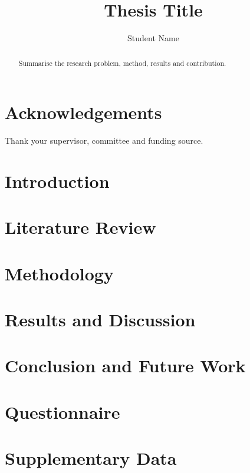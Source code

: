 \documentclass[12pt]{report}
\title{Thesis Title}
\author{Student Name}
\date{Department of Computer Engineering \par Your University \par 2026}
\begin{document}
\maketitle
\newpage

\begin{abstract}
Summarise the research problem, method, results and contribution.
\end{abstract}
\chapter*{Acknowledgements}
Thank your supervisor, committee and funding source.

\tableofcontents
\listoffigures

\chapter{Introduction}
\chapter{Literature Review}
\chapter{Methodology}
\chapter{Results and Discussion}
\chapter{Conclusion and Future Work}




\appendix
\chapter{Questionnaire}
\chapter{Supplementary Data}
\end{document}
